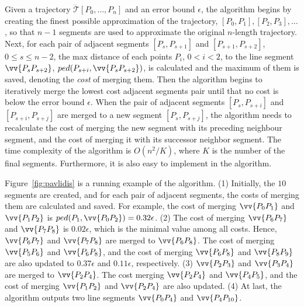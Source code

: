 Given a trajectory $\dddot{\mathcal{T}}[P_0, \ldots, P_n]$ and an error bound $\epsilon$,
the algorithm begins by creating the finest possible approximation of the trajectory, \ie $[P_0, P_1], [P_2, P_3], \ldots$, so that $n-1$ segments are used to approximate the original $n$-length trajectory.
Next, for each pair of adjacent segments $[P_{s}, P_{s+1}]$ and $[P_{s+1}, P_{s+2}]$, $0\le s \le n-2$,
the max distance of each points $P_i$, $0<i<2$, to the line segment $\vv{P_sP_{s+2}}$, \ie $ped(P_{s+i}, \vv{P_sP_{s+2}})$, is calculated and the maximum of them is saved, denoting the \emph{cost} of merging them.
Then the algorithm begins to iteratively merge the lowest cost adjacent segments pair
until that no cost is below the error bound $\epsilon$.
When the pair of adjacent segments $[P_{s}, P_{s+i}]$ and $[P_{s+i}, P_{s+j}]$ are merged to a new segment $[P_{s}, P_{s+j}]$, the algorithm needs to recalculate the cost of merging the new segment with its preceding neighbour segment, and the cost of merging it with its successor neighbor segment.
The time complexity of the algorithm is $O(n^2/K)$, where $K$ is the number of the final segments.
Furthermore, it is also easy to implement \sed in the \pavlidis algorithm.


\begin{example}
\label{exm-alg-squishe}
Figure~\ref{fig:pavlidis} is a running example of the \pavlidis algorithm.
(1) Initially, the $10$ segments are created, and for each pair of adjacent segments, the costs of merging them are calculated and saved. For example, the cost of merging $\vv{P_0P_1}$ and $\vv{P_1P_2}$ is $ped(P_{1}, \vv{P_0P_{2}}) = 0.32\epsilon$.
(2) The cost of merging $\vv{P_6P_7}$ and $\vv{P_7P_8}$ is $0.02\epsilon$, which is the minimal value among all costs. Hence, $\vv{P_6P_7}$ and $\vv{P_7P_8}$ are merged to $\vv{P_6P_8}$. The cost of merging $\vv{P_5P_6}$ and $\vv{P_6P_8}$, and the cost of merging $\vv{P_6P_8}$ and $\vv{P_8P_9}$ are also updated to $0.37\epsilon$ and $0.11\epsilon$, respectively.
(3) $\vv{P_2P_3}$ and $\vv{P_3P_4}$ are merged to $\vv{P_2P_4}$. The cost merging $\vv{P_2P_4}$ and $\vv{P_4P_5}$, and the cost of merging $\vv{P_1P_2}$ and $\vv{P_2P_4}$ are also updated.
(4) At last, the algorithm outputs two line segments $\vv{P_0P_4}$ and $\vv{P_4P_{10}}$.
\end{example}






